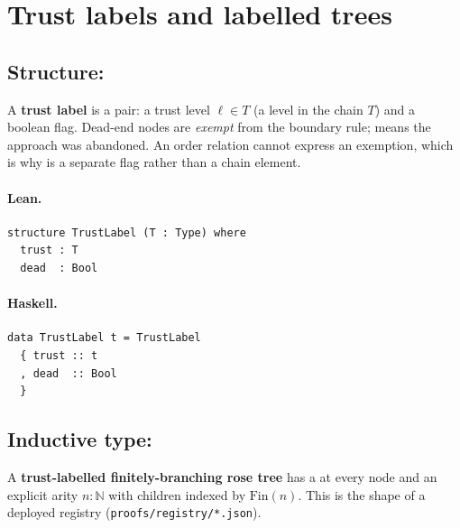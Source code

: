 \documentclass[11pt,a4paper]{article}
\begin{document}
\section{Trust labels and labelled trees}

\subsection{Structure: }

\begin{defn}
A \textbf{trust label} is a pair: a trust level $\ell \in T$ (a level in
the chain $T$) and a boolean  flag.  Dead-end nodes are
\emph{exempt} from the boundary rule;  means the approach
was abandoned.  An order relation cannot express an exemption, which is why
 is a separate flag rather than a chain element.
\end{defn}

\paragraph{Lean.}
\begin{lstlisting}[style=lean]
structure TrustLabel (T : Type) where
  trust : T
  dead  : Bool
\end{lstlisting}

\paragraph{Haskell.}
\begin{lstlisting}[style=haskell]
data TrustLabel t = TrustLabel
  { trust :: t
  , dead  :: Bool
  }
\end{lstlisting}


\subsection{Inductive type: }

\begin{defn}
A \textbf{trust-labelled finitely-branching rose tree} has a
 at every node and an explicit arity $n : \mathbb{N}$
with children indexed by $\mathrm{Fin}(n)$.  This is the shape of a deployed
registry (\texttt{proofs/registry/*.json}).
\end{defn}
\end{document}
